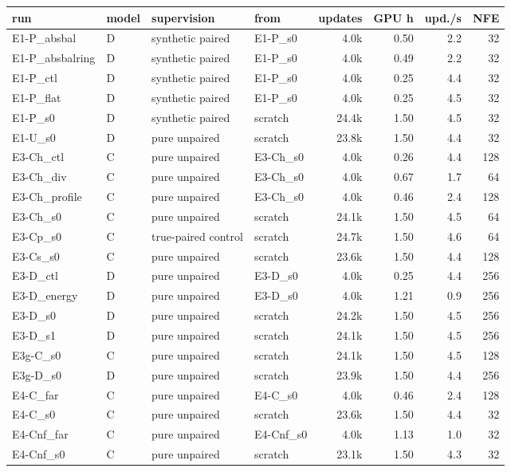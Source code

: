 \scriptsize
\setlength{\tabcolsep}{3pt}
\begin{tabular}{llllrrrr}
\toprule
run & model & supervision & from & updates & GPU h & upd./s & NFE \\
\midrule
E1-P\_absbal & D & synthetic paired & E1-P\_s0 & 4.0k & 0.50 & 2.2 & 32 \\
E1-P\_absbalring & D & synthetic paired & E1-P\_s0 & 4.0k & 0.49 & 2.2 & 32 \\
E1-P\_ctl & D & synthetic paired & E1-P\_s0 & 4.0k & 0.25 & 4.4 & 32 \\
E1-P\_flat & D & synthetic paired & E1-P\_s0 & 4.0k & 0.25 & 4.5 & 32 \\
E1-P\_s0 & D & synthetic paired & scratch & 24.4k & 1.50 & 4.5 & 32 \\
E1-U\_s0 & D & pure unpaired & scratch & 23.8k & 1.50 & 4.4 & 32 \\
E3-Ch\_ctl & C & pure unpaired & E3-Ch\_s0 & 4.0k & 0.26 & 4.4 & 128 \\
E3-Ch\_div & C & pure unpaired & E3-Ch\_s0 & 4.0k & 0.67 & 1.7 & 64 \\
E3-Ch\_profile & C & pure unpaired & E3-Ch\_s0 & 4.0k & 0.46 & 2.4 & 128 \\
E3-Ch\_s0 & C & pure unpaired & scratch & 24.1k & 1.50 & 4.5 & 64 \\
E3-Cp\_s0 & C & true-paired control & scratch & 24.7k & 1.50 & 4.6 & 64 \\
E3-Cs\_s0 & C & pure unpaired & scratch & 23.6k & 1.50 & 4.4 & 128 \\
E3-D\_ctl & D & pure unpaired & E3-D\_s0 & 4.0k & 0.25 & 4.4 & 256 \\
E3-D\_energy & D & pure unpaired & E3-D\_s0 & 4.0k & 1.21 & 0.9 & 256 \\
E3-D\_s0 & D & pure unpaired & scratch & 24.2k & 1.50 & 4.5 & 256 \\
E3-D\_s1 & D & pure unpaired & scratch & 24.1k & 1.50 & 4.5 & 256 \\
E3g-C\_s0 & C & pure unpaired & scratch & 24.1k & 1.50 & 4.5 & 128 \\
E3g-D\_s0 & D & pure unpaired & scratch & 23.9k & 1.50 & 4.4 & 256 \\
E4-C\_far & C & pure unpaired & E4-C\_s0 & 4.0k & 0.46 & 2.4 & 128 \\
E4-C\_s0 & C & pure unpaired & scratch & 23.6k & 1.50 & 4.4 & 32 \\
E4-Cnf\_far & C & pure unpaired & E4-Cnf\_s0 & 4.0k & 1.13 & 1.0 & 32 \\
E4-Cnf\_s0 & C & pure unpaired & scratch & 23.1k & 1.50 & 4.3 & 32 \\

\end{tabular}
